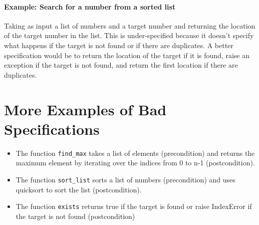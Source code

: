 \documentclass[oneside,11pt,dvipsnames]{book}
\newcommand{\code}[1]{\texttt{#1}}
\begin{document}
\paragraph{Example: Search for a number from a sorted list} Taking as input a list of numbers and a target number and returning the location of the target number in the list.  This is under-specified because it doesn't specify what happens if the target is not found or if there are duplicates. A better specification would be to return the location of the target if it is found, raise an exception if the target is not found, and return the first location if there are duplicates.


\section{More Examples of Bad Specifications}

\begin{itemize}
    \item The function \texttt{find\_max} takes a list of elements (precondition) and returns the maximum element by iterating over the indices from 0 to n-1 (postcondition).
    \item The function \texttt{sort\_list} sorts a list of numbers (precondition) and uses quicksort to sort the list (postcondition).
    \item The function \texttt{exists} returns true if the target is found or raise IndexError if the target is not found (postcondition)
\end{itemize}



\end{document}
